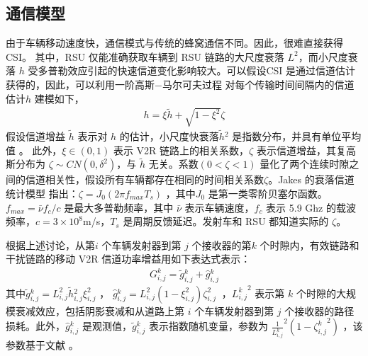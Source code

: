 \subsection{通信模型}\label{section3-2-1}
由于车辆移动速度快，通信模式与传统的蜂窝通信不同。因此，很难直接获得 CSI。 其中，RSU 仅能准确获取车辆到 RSU 链路的大尺度衰落 $L^2$，而小尺度衰落 $h$ 受多普勒效应引起的快速信道变化影响较大。可以假设CSI 是通过信道估计获得的，因此，可以利用一阶高斯$-$马尔可夫过程 \supercite{Kim2011} 对每个传输时间间隔内的信道估计$h$ 建模如下，%
\begin{eqnarray}\label{E3-1}
h=\xi{\widetilde{h}}+\sqrt{1-\xi^2}\zeta
\end{eqnarray}
假设信道增益 $\widetilde{h}$ 表示对 $h$ 的估计，小尺度快衰落${\widetilde{h}}\phantom{}^2$ 是指数分布，并具有单位平均值 \supercite{Sakr2014}。 此外，$\xi\in\left(0,1\right)$ 表示 V2R 链路上的相关系数，$\zeta$ 表示信道增益，其复高斯分布为 $\zeta\sim CN\left(0,\delta^2\right)$，与 $\widetilde{h}$ 无关。系数$\left(0<\zeta<1\right)$ 量化了两个连续时隙之间的信道相关性，假设所有车辆都存在相同的时间相关系数$\zeta$。Jakes 的衰落信道统计模型 \supercite{Kim2011} 指出：$\zeta=J_0\left(2\pi f_{max}T_s\right)$ ，其中$J_0$ 是第一类零阶贝塞尔函数。$f_{max}=\bar{\nu}f_c/c $ 是最大多普勒频率，其中 $\bar{\nu}$ 表示车辆速度，$f_c$ 表示 5.9 Ghz 的载波频率，$c=3\times{10}^8$m/s，$T_s$ 是周期反馈延迟。发射车和 RSU 都知道实际的 $\zeta$。

根据上述讨论，从第$ i$ 个车辆发射器到第 $j $ 个接收器的第$ k $ 个时隙内，有效链路和干扰链路的移动 V2R 信道功率增益用如下表达式表示：
\begin{eqnarray}\label{E3-2}
G_{i,j}^k={\widetilde{g}}\phantom{}_{i,j}^k+{\hat{g}}\phantom{}_{i,j}^k
\end{eqnarray}
其中${\widetilde{g}}\phantom{}_{i,j}^k=L_{i,j}^2{\widetilde{h}}\phantom{}_{i,j}^2\xi_{i,j}^2$ ， ${\hat{g}}\phantom{}_{i,j}^k=L_{i,j}^2\left(1-\xi_{i,j}^2\right)\zeta_{i,j}^2\ $ ，$ {L_{i,j}^k}^2 $
表示第 $k $ 个时隙的大规模衰减效应，包括阴影衰减和从道路上第 $i$ 个车辆发射器到第 $ j $ 个接收器的路径损耗。此外，${\hat{g}}\phantom{}_{i,j}^k$ 是观测值，${\widetilde{g}}\phantom{}_{i,j}^k$ 表示指数随机变量，参数为 $\frac{1}{L_{i,j}^k}^2({1-{\zeta_{i,j}^k}^2}) $ ，该参数基于文献 \cite{Xie2020}。

